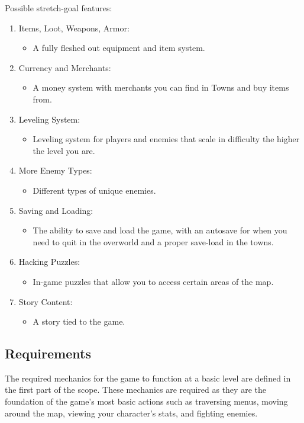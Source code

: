 \documentclass[10pt,conference,onecolumn,compsoc]{IEEEtran}
\begin{document}
Possible stretch-goal features:
\begin{enumerate}

\item Items, Loot, Weapons, Armor:
\begin{itemize}
\item A fully fleshed out equipment and item system.
\end{itemize}

\item Currency and Merchants:
\begin{itemize}
\item A money system with merchants you can find in Towns and buy items from.
\end{itemize}

\item Leveling System:
\begin{itemize}
\item Leveling system for players and enemies that scale in difficulty the higher the level you are.
\end{itemize}

\item More Enemy Types:
\begin{itemize}
\item Different types of unique enemies.
\end{itemize}

\item Saving and Loading: 
\begin{itemize}
\item The ability to save and load the game, with an autosave for when you need to quit in the overworld and a proper save-load in the towns.
\end{itemize}

\item Hacking Puzzles:
\begin{itemize}
\item In-game puzzles that allow you to access certain areas of the map.
\end{itemize}

\item Story Content:
\begin{itemize}
\item A story tied to the game.
\end{itemize}

\end{enumerate}



\subsection{Requirements}
The required mechanics for the game to function at a basic level are defined in the first part of the scope. These mechanics are required as they are the foundation of the game's most basic actions such as traversing menus, moving around the map, viewing your character's stats, and fighting enemies.
\end{document}

